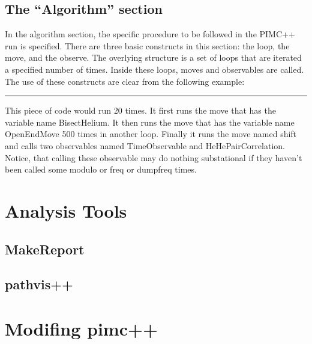 \documentclass{book}
\begin{document}
\section{The ``Algorithm'' section}
In the algorithm section, the specific procedure to be followed in the
PIMC++ run is specified.  There are three basic constructs in this
section: the loop, the move, and the observe. The overlying structure
is a set of loops that are iterated a specified number of times.
Inside these loops, moves and observables are called.  The use of
these constructs are clear from the following example:
\rule{0.6cm}{0cm}
This piece of code would run 20 times.  It first runs the move that
has the variable name BisectHelium. It then runs the move that has the
variable name OpenEndMove 500 times in another loop.  Finally it runs
the move named shift and calls two observables named TimeObservable
and HeHePairCorrelation. Notice, that calling these observable may do
nothing substational if they haven't been called some modulo or freq
or dumpfreq times.
\chapter{Analysis Tools}
\section{MakeReport}
\section{pathvis++}


\chapter{Modifing pimc++}
\end{document}
